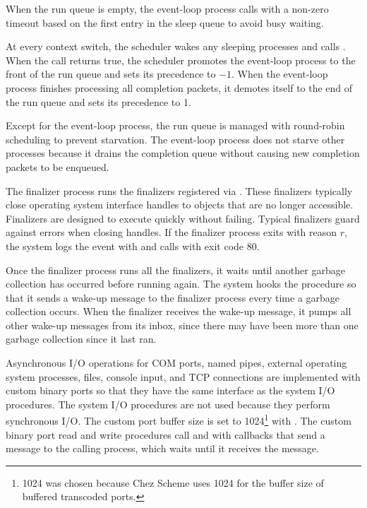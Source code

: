 When the run queue is empty, the event-loop process calls
 with a non-zero timeout based on the
first entry in the sleep queue to avoid busy waiting.

At every context switch, the scheduler wakes any sleeping processes
and calls . When the call
returns true, the scheduler promotes the event-loop process to the
front of the run queue and sets its precedence to $-1$.  When the
event-loop process finishes processing all completion packets, it
demotes itself to the end of the run queue and sets its precedence to
1.

  \mitigation Except
for the event-loop process, the run queue is managed with round-robin
scheduling to prevent starvation. The event-loop process does not
starve other processes because it drains the completion queue without
causing new completion packets to be enqueued.

The finalizer process runs the finalizers registered via
. These finalizers typically close operating
system interface handles to objects that are no longer
accessible.   \mitigation Finalizers are designed to execute quickly
without failing. Typical finalizers guard against errors when closing
handles. If the finalizer process exits with reason $r$, the
system logs the event
 with
 and calls 
with exit code 80.

Once the finalizer process runs all the finalizers, it waits until
another garbage collection has occurred before running again. The
system hooks the  procedure so that
it sends a wake-up message to the finalizer process every time a
garbage collection occurs.  When the finalizer receives the wake-up
message, it pumps all other wake-up messages from its inbox, since
there may have been more than one garbage collection since it last
ran.

Asynchronous I/O operations for COM ports, named pipes, external
operating system processes, files, console input, and TCP connections
are implemented with custom binary ports so that they have the same
interface as the system I/O procedures. The system I/O procedures are
not used because they perform synchronous I/O.  The custom port buffer
size is set to 1024\footnote{1024 was chosen because Chez Scheme uses
  1024 for the buffer size of buffered transcoded ports.} with
.  The custom binary port read and
write procedures call  and
 with callbacks that send a message to the
calling process, which waits until it receives the message.

